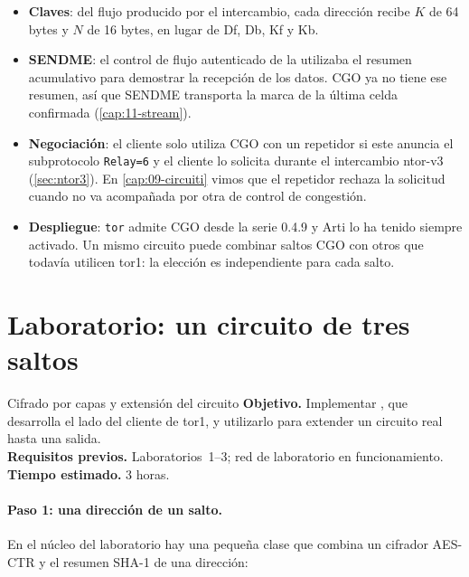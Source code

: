 \begin{itemize}
  \item \textbf{Claves}: del flujo producido por el intercambio, cada dirección recibe $K$ de 64 bytes y $N$ de 16 bytes, en lugar de Df, Db, Kf y Kb.
  \item \textbf{SENDME}: el control de flujo autenticado de la  utilizaba el resumen acumulativo para demostrar la recepción de los datos. CGO ya no tiene ese resumen, así que SENDME transporta la marca de la última celda confirmada (\cref{cap:11-stream}).
  \item \textbf{Negociación}: el cliente solo utiliza CGO con un repetidor si este anuncia el subprotocolo \texttt{Relay=6} y el cliente lo solicita durante el intercambio ntor-v3 (\cref{sec:ntor3}). En \cref{cap:09-circuiti} vimos que el repetidor rechaza la solicitud cuando no va acompañada por otra de control de congestión.
  \item \textbf{Despliegue}: \texttt{tor} admite CGO desde la serie 0.4.9 y Arti lo ha tenido siempre activado. Un mismo circuito puede combinar saltos CGO con otros que todavía utilicen tor1: la elección es independiente para cada salto.
\end{itemize}

\section{Laboratorio: un circuito de tres saltos}\label{sec:lab-cifratura}

\begin{laboratorio}[4]{Cifrado por capas y extensión del circuito}
\textbf{Objetivo.} Implementar , que desarrolla el lado del cliente de tor1, y utilizarlo para extender un circuito real hasta una salida.\\
\textbf{Requisitos previos.} Laboratorios~1--3; red de laboratorio en funcionamiento.\\
\textbf{Tiempo estimado.} 3 horas.
\end{laboratorio}

\paragraph{Paso 1: una dirección de un salto.} En el núcleo del laboratorio hay una pequeña clase que combina un cifrador AES-CTR y el resumen SHA-1 de una dirección:


